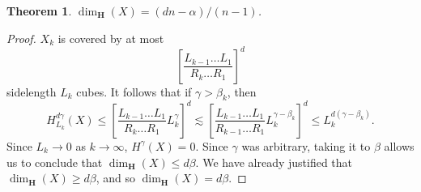 \documentclass{article}
\theoremstyle{plain}
\theoremstyle{plain}
\newtheorem{theorem}{Theorem}
\begin{document}
\begin{theorem}
	$\dim_{\mathbf{H}}(X) = (dn - \alpha)/(n-1)$.
\end{theorem}
\begin{proof}
	$X_k$ is covered by at most
	\[ \left[ \frac{L_{k-1} \dots L_1}{R_k \dots R_1} \right]^d \]
	sidelength $L_k$ cubes. It follows that if $\gamma > \beta_k$, then
	\[ H^{d\gamma}_{L_k}(X) \leq \left[ \frac{L_{k-1} \dots L_1}{R_k \dots R_1} L_k^\gamma \right]^d \lesssim \left[ \frac{L_{k-1} \dots L_1}{R_{k-1} \dots R_1} L_k^{\gamma - \beta_k} \right]^d \leq L_k^{d(\gamma - \beta_k)}. \]
	Since $L_k \to 0$ as $k \to \infty$, $H^\gamma(X) = 0$. Since $\gamma$ was arbitrary, taking it to $\beta$ allows us to conclude that $\dim_{\mathbf{H}}(X) \leq d \beta$. We have already justified that $\dim_{\mathbf{H}}(X) \geq d\beta$, and so $\dim_{\mathbf{H}}(X) = d \beta$.
\end{proof}


\end{document}
